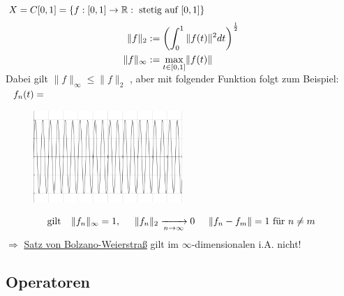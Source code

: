 \begin{beispiel}
$X = C[0, 1] = \{ f : [0, 1] \rightarrow \mathbb{R}: \text{ stetig auf } [0, 1] \}$
\begin{align*}
\| f \|_{2} & := \left( \int_{0}^{1} \| f(t) \|^{2} dt \right)^{\frac{1}{2}} \\
\| f \|_{\infty} & :=  \smash{\displaystyle\max_{t \in [0, 1]}}  \| f(t) \|
\end{align*}
\newline
Dabei gilt $\| f \|_{\infty} \leq \| f \|_{2}$ , aber mit folgender Funktion folgt zum Beispiel:$\hspace{0.25cm} f_n(t) = $ \\
	\begin{figure}[H]
		\centering
		\includegraphics[width=160pt]{images/1.1.1-example1.png}
	\end{figure} \[ \text{gilt } \hspace{0.25cm} \| f_n \|_{\infty} = 1, \hspace{0.5cm} \| f_n \|_{2} \xrightarrow[n \rightarrow \infty]{} 0  
\hspace{0.5cm} \| f_{n} - f_{m} \| = 1 \text{ für } n \neq m \]
$ \Rightarrow $ \hyperref[s:1-bolzanoweierstrass]{Satz von Bolzano-Weierstra{\ss}} gilt im $\infty$-dimensionalen i.A. nicht!
\end{beispiel}

\subsection{Operatoren}

